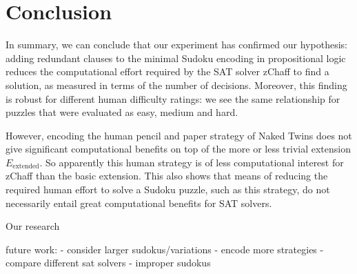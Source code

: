 \documentclass[10pt,a4paper,leqno]{article}
\begin{document}
\section*{Conclusion} 


In summary, we can conclude that our experiment has confirmed our hypothesis: adding redundant clauses to the minimal Sudoku encoding in propositional logic reduces the computational effort required by the SAT solver zChaff to find a solution, as measured in terms of the number of decisions. Moreover, this finding is robust for different human difficulty ratings: we see the same relationship for puzzles that were evaluated as easy, medium and hard. 

However, encoding the human pencil and paper strategy of Naked Twins does not give significant computational benefits on top of the more or less trivial extension $E_{\text{extended}}$. So apparently this human strategy is of less computational interest for zChaff than the basic extension. This also shows that means of reducing the required human effort to solve a Sudoku puzzle, such as this strategy, do not necessarily entail great computational benefits for SAT solvers. 

Our research  



future work:
- consider larger sudokus/variations
- encode more strategies
- compare different sat solvers
- improper sudokus
\end{document}
